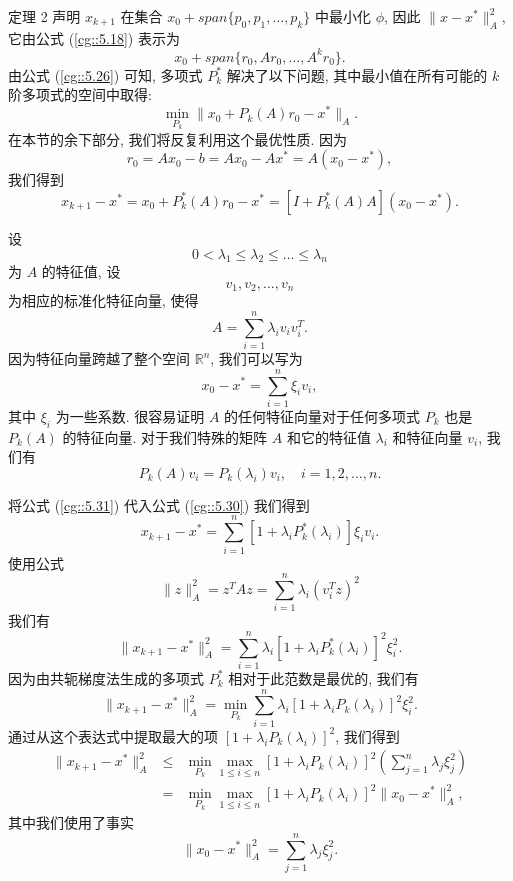 \documentclass[a4paper]{ctexart}
\begin{document}
{定理 2 声明 $x_{k + 1}$ 在集合 $x_0 + span\{p_0, p_1, \ldots, p_k\}$ 中最小化 $\phi$, 
因此 $\|x - x^*\|_A^2$, 它由公式 (\ref{cg::5.18}) 表示为
$$
x_0 + span\{r_0, Ar_0, \ldots, A^kr_0\}.
$$
由公式 (\ref{cg::5.26}) 可知, 多项式 $P_k^*$ 解决了以下问题, 
其中最小值在所有可能的 $k$ 阶多项式的空间中取得:
\begin{equation}
  \min_{P_k}\|x_0 + P_k(A)r_0 - x^*\|_A. \label{cg::5.29}
\end{equation}
在本节的余下部分, 我们将反复利用这个最优性质.
因为
$$
r_0 = Ax_0 - b = Ax_0 - Ax^* = A(x_0 - x^*),
$$
我们得到
\begin{equation}
x_{k+1} - x^* = x_0 + P_k^*(A)r_0 - x^* = [I + P_k^*(A)A](x_0 - x^*). 
\label{cg::5.30}
\end{equation}

设 
$$
0 < \lambda_1 \leq \lambda_2 \leq \ldots \leq \lambda_n
$$
为 $A$ 的特征值, 设
$$
v_1, v_2, \ldots, v_n
$$
为相应的标准化特征向量, 使得
$$
A = \sum_{i=1}^{n} \lambda_iv_iv_i^T.
$$
因为特征向量跨越了整个空间 $\mathbb{R}^n$, 我们可以写为
\begin{equation}
  x_0 - x^* = \sum_{i=1}^{n} \xi_iv_i,
  \label{cg::5.31}
\end{equation}
其中 $\xi_i$ 为一些系数. 很容易证明 $A$ 的任何特征向量对于任何多项式
$P_k$ 也是 $P_k(A)$ 的特征向量. 
对于我们特殊的矩阵 $A$ 和它的特征值 $\lambda_i$ 和特征向量 $v_i$, 我们有
$$
P_k(A)v_i = P_k(\lambda_i)v_i, \quad i = 1, 2, \ldots, n.
$$

将公式 (\ref{cg::5.31}) 代入公式 (\ref{cg::5.30}) 我们得到
$$
x_{k+1} - x^* = \sum_{i=1}^{n} [1 + \lambda_i P^*_k (\lambda_i)] \xi_i v_i.
$$
使用公式 
$$
\|z\|^2_A = z^T Az = \sum_{i=1}^{n} \lambda_i (v_i^T z)^2
$$
我们有
\begin{equation}
\|x_{k+1} - x^*\|^2_A 
= \sum_{i=1}^{n} \lambda_i [1 + \lambda_i P^*_k (\lambda_i)]^2 \xi_i^2. \label{cg::5.32}
\end{equation}
因为由共轭梯度法生成的多项式 $P^*_k$ 相对于此范数是最优的, 我们有
$$
\|x_{k+1} - x^*\|^2_A 
= \min_{P_k} \sum_{i=1}^{n} \lambda_i [1 + \lambda_i P_k (\lambda_i)]^2 \xi_i^2.
$$
通过从这个表达式中提取最大的项 $[1 + \lambda_i P_k (\lambda_i)]^2$, 我们得到
\begin{equation}
  \begin{array}{rcl}
\|x_{k+1} - x^*\|^2_A &\leq& 
\min_{P_k} \max_{1 \leq i \leq n} 
[1 + \lambda_i P_k (\lambda_i)]^2 \left(\sum_{j=1}^{n} \lambda_j \xi_j^2\right) \\
&=& \min_{P_k} \max_{1 \leq i \leq n} [1 + \lambda_i P_k (\lambda_i)]^2 \|x_0 - x^*\|^2_A,
\label{cg::5.33}
  \end{array}
\end{equation}
其中我们使用了事实
$$
\|x_0 - x^*\|^2_A = \sum_{j=1}^{n} \lambda_j \xi_j^2.
$$

}
\end{document}
